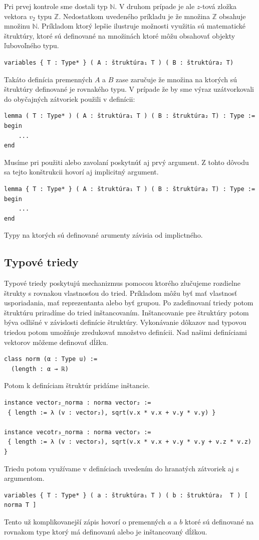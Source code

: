 \documentclass[a4paper,10pt,oneside]{report}%
\begin{document}
    Pri prvej kontrole sme dostali typ $\mathbb{N}$.
    V druhom prípade je ale $z$-tová zložka vektora $v_{2}$ typu $\mathbb{Z}$.
    Nedostatkom uvedeného príkladu je že množina $\mathbb{Z}$ obsahuje
množinu $\mathbb{N}$.
    Príkladom ktorý lepšie ilustruje možnosti využitia sú matematické štruktúry,
ktoré sú definované na množinách ktoré môžu obsahovať objekty ľubovoľného typu.
\begin{lstlisting}
variables { T : Type* } ( A : štruktúra₁ T ) ( B : štruktúra₂ T)
\end{lstlisting}
    Takáto definícia premenných $A$ a $B$ zase zaručuje že množina na ktorých sú
štruktúry definované je rovnakého typu.
    V prípade že by sme výraz uzátvorkovali do obyčajných zátvoriek použili v
definícii:
\begin{lstlisting}
lemma ( T : Type* ) ( A : štruktúra₁ T ) ( B : štruktúra₂ T) : Type :=
begin
    ...
end
\end{lstlisting}
    Musíme pri použiti alebo zavolaní poskytnúť aj prvý argument.
    Z tohto dôvodu sa tejto konštrukcii hovorí aj implicitný argument.
\begin{lstlisting}
lemma { T : Type* } ( A : štruktúra₁ T ) ( B : štruktúra₂ T) : Type :=
begin
    ...
end
\end{lstlisting}
Typy na ktorých sú definované arumenty závisia od implictného.
\subsection{Typové triedy}
    Typové triedy poskytujú mechanizmus pomocou ktorého zlučujeme rozdielne štrukty
s rovnakou vlastnosťou do tried.
    Príkladom môžu byť mať vlastnosť usporiadania, mať reprezentanta alebo
byť grupou.
    Po zadefinovaní triedy potom štruktúru priradíme do tried inštancovaním.
    Inštancovanie pre štruktúry potom býva odlišné v závislosti definície štruktúry.
    Vykonávanie dôkazov nad typovou triedou potom umožňuje zredukovať množstvo definícii.
    Nad našimi definíciami vektorov môžeme definovať dĺžku.
\begin{lstlisting}
class norm (α : Type u) :=
  (length : α → ℝ)
\end{lstlisting}
    Potom k definíciam štruktúr pridáme inštancie.
\begin{lstlisting}
instance vector₂_norma : norma vector₂ :=
 { length := λ (v : vector₂), sqrt(v.x * v.x + v.y * v.y) }

instance vecotr₃_norma : norma vector₃ :=
 { length := λ (v : vector₃), sqrt(v.x * v.x + v.y * v.y + v.z * v.z) }
\end{lstlisting}
    Triedu potom využívame v definíciach uvedením do hranatých zátvoriek aj s
argumentom.
\begin{lstlisting}
variables { T : Type* } ( a : štruktúra₁ T ) ( b : štruktúra₂  T ) [ norma T ]
\end{lstlisting}
    Tento už komplikovanejší zápis hovorí o premenných $a$ a $b$ ktoré sú definované
na rovnakom type ktorý má definovanú alebo je inštancovaný dĺžkou.
\end{document}
